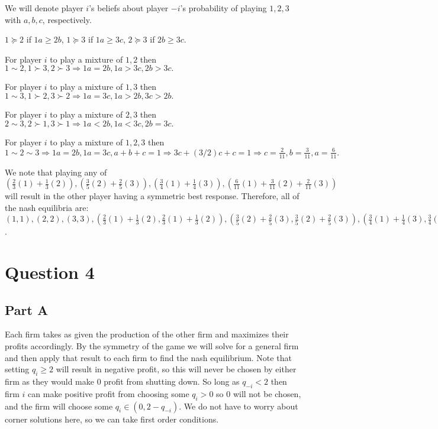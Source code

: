 \documentclass[11pt]{article} %
\begin{document}
We will denote player $i$'s beliefs about player $-i$'s probability of playing $1,2,3$ with $a,b,c$, respectively.

$1 \succeq 2$ if $1a\geq 2b$, $1 \succeq 3$ if $1a \geq 3c$, $2\succeq 3$ if $ 2b \geq 3c$.

For player $i$ to play a mixture of $1,2$ then $1 \sim 2, 1\succ 3, 2 \succ 3 \Rightarrow 1a = 2b, 1a>3c,2b>3c.$

For player $i$ to play a mixture of $1,3$ then $1 \sim 3, 1\succ 2, 3 \succ 2 \Rightarrow 1a = 3c, 1a>2b,3c>2b.$

For player $i$ to play a mixture of $2,3$ then $2 \sim 3, 2\succ 1, 3 \succ 1 \Rightarrow 1a < 2b, 1a<3c,2b=3c.$

For player $i$ to play a mixture of $1,2,3$ then $1 \sim 2 \sim 3 \Rightarrow 1a = 2b, 1a = 3c, a+b+c=1 \Rightarrow 3c + (3/2)c + c = 1 \Rightarrow c = \frac{2}{11}, b = \frac{3}{11},a = \frac{6}{11}.$

We note that playing any of $(\frac{2}{3} (1) + \frac{1}{3} (2)),(\frac{3}{5} (2) + \frac{2}{5} (3)),(\frac{3}{4} (1) + \frac{1}{4} (3)),(\frac{6}{11} (1) + \frac{3}{11} (2) + \frac{2}{11}(3))$ will result in the other player having a symmetric best response. Therefore, all of the nash equilibria are: $(1,1),(2,2),(3,3),(\frac{2}{3} (1) + \frac{1}{3} (2),\frac{2}{3} (1) + \frac{1}{3} (2)),(\frac{3}{5} (2) + \frac{2}{5} (3),\frac{3}{5} (2) + \frac{2}{5} (3)),(\frac{3}{4} (1) + \frac{1}{4} (3),\frac{3}{4} (1) + \frac{1}{4} (3)),(\frac{6}{11} (1) + \frac{3}{11} (2) + \frac{2}{11}(3),\frac{6}{11} (1) + \frac{3}{11} (2) + \frac{2}{11}(3))$.


\section{Question 4}
\subsection{Part A}
Each firm takes as given the production of the other firm and maximizes their profits accordingly. By the symmetry of the game we will solve for a general firm and then apply that result to each firm to find the nash equilibrium. Note that setting $q_i \geq 2$ will result in negative profit, so this will never be chosen by either firm as they would make $0$ profit from shutting down. So long as $q_{-i}<2$ then firm $i$ can make positive profit from choosing some $q_i>0$ so $0$ will not be chosen, and the firm will choose some $q_i \in (0,2-q_{-i}).$ We do not have to worry about corner solutions here, so we can take first order conditions. 
\end{document}

